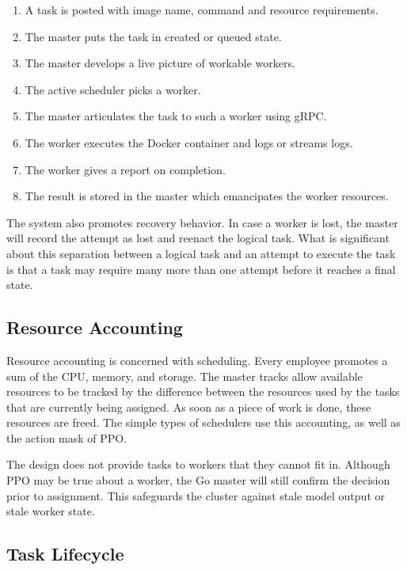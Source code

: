 \begin{enumerate}
    \item A task is posted with image name, command and resource requirements.
    \item The master puts the task in created or queued state.
    \item The master develops a live picture of workable workers.
    \item The active scheduler picks a worker.
    \item The master articulates the task to such a worker using gRPC.
    \item The worker executes the Docker container and logs or streams logs.
    \item The worker gives a report on completion.
    \item The result is stored in the master which emancipates the worker resources.
\end{enumerate}

The system also promotes recovery behavior. In case a worker is lost, the master will record the attempt as lost and reenact the logical task. What is significant about this separation between a logical task and an attempt to execute the task is that a task may require many more than one attempt before it reaches a final state.

\subsection{Resource Accounting}

Resource accounting is concerned with scheduling. Every employee promotes a sum of the CPU, memory, and storage. The master tracks allow available resources to be tracked by the difference between the resources used by the tasks that are currently being assigned. As soon as a piece of work is done, these resources are freed. The simple types of schedulers use this accounting, as well as the action mask of PPO.

The design does not provide tasks to workers that they cannot fit in. Although PPO may be true about a worker, the Go master will still confirm the decision prior to assignment. This safeguards the cluster against stale model output or stale worker state.

\subsection{Task Lifecycle}


